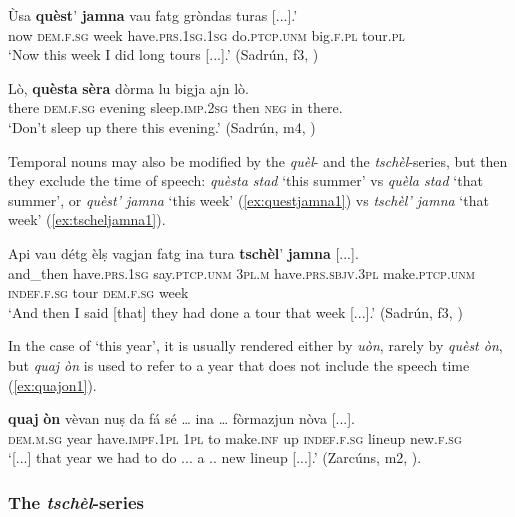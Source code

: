 \ea\label{ex:questjamna1}
\gll Ùsa \textbf{quèst}' \textbf{jamna} vau fatg gròndas turas [...].'\\
now \textsc{dem.f.sg} week have.\textsc{prs.1sg.1sg} do.\textsc{ptcp.unm} big.\textsc{f.pl} tour.\textsc{pl}\\
\glt `Now this week I did long tours [...].' (Sadrún, f3, )
\z

\ea\label{ex:questasera1}
\gll Lò, \textbf{quèsta} \textbf{sèra} dòrma lu bigja ajn lò.\\
there \textsc{dem.f.sg} evening sleep.\textsc{imp.2sg} then  \textsc{neg} in there.\\
\glt `Don't sleep up there this evening.' (Sadrún, m4, )
\z

Temporal nouns may also be modified by the \textit{quèl}- and the \textit{tschèl}-series, but then they exclude the time of speech: \textit{quèsta stad} `this summer' vs \textit{quèla stad} `that summer', or \textit{quèst' jamna} `this week' (\ref{ex:questjamna1}) vs \textit{tschèl' jamna} `that week'  (\ref{ex:tscheljamna1}).

\ea\label{ex:tscheljamna1}
\gll Api vau détg èlṣ vagjan fatg ina tura \textbf{tschèl}’ \textbf{jamna} [...].\\  
and\_then have.\textsc{prs.1sg} say.\textsc{ptcp.unm} \textsc{3pl.m} have.\textsc{prs.sbjv.3pl} make.\textsc{ptcp.unm} \textsc{indef.f.sg} tour  \textsc{dem.f.sg} week\\
\glt `And then I said [that] they had done a tour that week [...].' (Sadrún, f3, )
\z

In the case of `this year', it is usually rendered either by \textit{uòn}, rarely by  \textit{quèst òn}, but \textit{quaj òn} is used to refer to a year that does not include the speech time (\ref{ex:quajon1}).

\ea\label{ex:quajon1}
\gll [...] \textbf{quaj} \textbf{òn} vèvan nuṣ da fá sé … ina … fòrmazjun nòva [...].\\
{} \textsc{dem.m.sg} year have.\textsc{impf.1pl} \textsc{1pl} to make.\textsc{inf} up {} \textsc{indef.f.sg} {} lineup  new.\textsc{f.sg}\\
\glt `[...] that year we had to do ... a .. new lineup [...].' (Zarcúns, m2, ).
\z

\subsubsection{The \textit{tschèl}-series}\label{sec:3.2.2.4}

